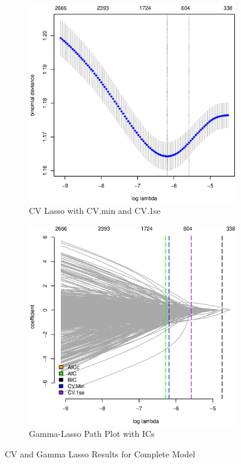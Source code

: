 \documentclass[11pt, fleqn]{article}
\begin{document}
\begin{figure}
  \centering
  \begin{subfigure}[b]{0.49\textwidth}
    \includegraphics[width=\textwidth]{cv_nhl_gamlr_a.eps}
    \caption{CV Lasso with CV.min and CV.1se}
    \label{fig:cv_nhl}
  \end{subfigure}
  \hfill
  \begin{subfigure}[b]{0.49\textwidth}
    \includegraphics[width=\textwidth]{ic_nhl_c.eps}
    \caption{Gamma-Lasso Path Plot with ICs}
    \label{fig:ic_nhl}
  \end{subfigure}
  \caption{CV and Gamma Lasso Results for Complete Model}
\end{figure}
\end{document}

